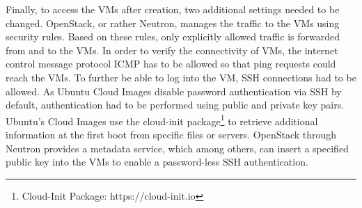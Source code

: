             \noindent Finally, to access the \acp{VM} after creation, two additional settings needed to be changed.
            OpenStack, or rather Neutron, manages the traffic to the \acp{VM} using security rules.
            Based on these rules, only explicitly allowed traffic is forwarded from and to the \acp{VM}.
            In order to verify the connectivity of \acp{VM}, the internet control message protocol ICMP has to be allowed so that ping requests could reach the \acp{VM}.
            To further be able to log into the VM, \ac{SSH} connections had to be allowed.
            As Ubuntu Cloud Images disable password authentication via \ac{SSH} by default, authentication had to be performed using public and private key pairs.
            Ubuntu's Cloud Images use the cloud-init package\footnote{Cloud-Init Package: https://cloud-init.io} to retrieve additional information at the first boot from specific files or servers.
            OpenStack through Neutron provides a metadata service, which among others, can insert a specified public key into the \acp{VM} to enable a password-less \ac{SSH} authentication.
            
